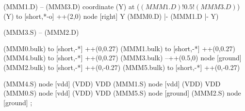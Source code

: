 \begin{circuitikz}[american]
	(MMM1.D) -- (MMM3.D)
	coordinate (Y) at ($(MMM1.D)!0.5!(MMM3.D)$)
	(Y) to [short,*-o] ++(2,0) node [right] {Y}
	(MMM0.D) |- (MMM1.D |- Y)
	
	(MMM3.S) -- (MMM2.D)
	
	(MMM0.bulk) to [short,-*] ++(0,0.27)
	(MMM1.bulk) to [short,-*] ++(0,0.27)
	(MMM4.bulk) to [short,-*] ++(0,0.27)
	(MMM3.bulk) --++(0.5,0) node [ground] {}
	(MMM2.bulk) to [short,-*] ++(0,-0.27)
	(MMM5.bulk) to [short,-*] ++(0,-0.27)
	

	(MMM4.S) node [vdd] (VDD) {VDD}
	(MMM1.S) node [vdd] (VDD) {VDD}
	(MMM0.S) node [vdd] (VDD) {VDD}
	(MMM5.S) node [ground] {}
	(MMM2.S) node [ground] {}
;

\end{circuitikz}
